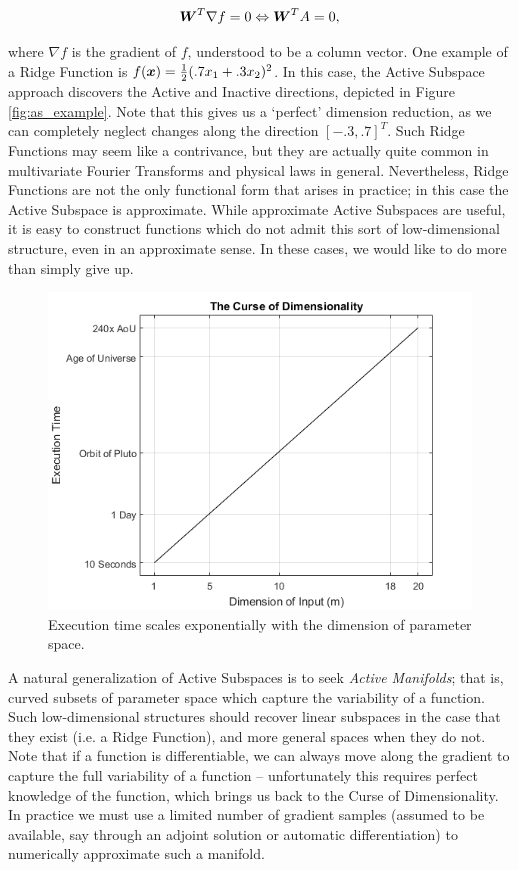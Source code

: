 \documentclass[]{aiaa-tc}%
\begin{document}
\begin{equation}
\boldsymbol{W}^T\nabla f = 0 \Leftrightarrow \boldsymbol{W}^TA = 0, \label{eq:ridge_property}
\end{equation}

where $\nabla f$ is the gradient of $f$, understood to be a column vector. One example of a Ridge Function is $f(\boldsymbol{x}) = \frac{1}{2}(.7x_1+.3x_2)^2$. In this case, the Active Subspace approach discovers the Active and Inactive directions, depicted in Figure \ref{fig:as_example}. Note that this gives us a `perfect' dimension reduction, as we can completely neglect changes along the direction $[-.3,.7]^T$. Such Ridge Functions may seem like a contrivance, but they are actually quite common in multivariate Fourier Transforms\cite{pinkus2015} and physical laws in general.\cite{Constantine2016} Nevertheless, Ridge Functions are not the only functional form that arises in practice; in this case the Active Subspace is approximate. While approximate Active Subspaces are useful, it is easy to construct functions which do not admit this sort of low-dimensional structure, even in an approximate sense. In these cases, we would like to do more than simply give up.

\begin{figure}
 \includegraphics{../images/curse_of_dimensionality}
 \caption{Execution time scales exponentially with the dimension of parameter space.}
 \label{fig:curse_of_dimensionality}
\end{figure}

A natural generalization of Active Subspaces is to seek \emph{Active Manifolds}; that is, curved subsets of parameter space which capture the variability of a function. Such low-dimensional structures should recover linear subspaces in the case that they exist (i.e. a Ridge Function), and more general spaces when they do not. Note that if a function is differentiable, we can always move along the gradient to capture the full variability of a function -- unfortunately this requires perfect knowledge of the function, which brings us back to the Curse of Dimensionality. In practice we must use a limited number of gradient samples (assumed to be available, say through an adjoint solution\cite{Jameson1988} or automatic differentiation\cite{Rall1981}) to numerically approximate such a manifold.
\end{document}
